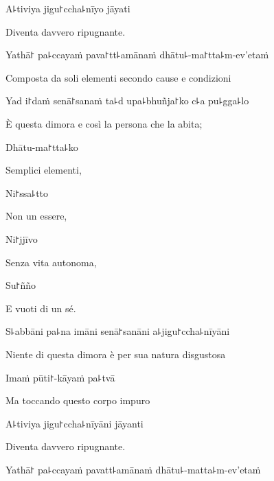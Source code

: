A꜕tiviya jigu꜓ccha꜕nīyo jāyati

\begin{english}
Diventa davvero ripugnante.
\end{english}

Yathā꜓ pa꜕ccayaṁ pava꜓tt꜕amānaṁ dhātu꜕-ma꜓tta꜕m-ev'etaṁ

\begin{english}
Composta da soli elementi secondo cause e condizioni
\end{english}

Yad i꜓daṁ senā꜓sanaṁ ta꜕d upa꜕bhuñja꜓ko c꜕a pu꜕gga꜕lo

\begin{english}
È questa dimora e così la persona che la abita;
\end{english}

Dhātu-ma꜓tta꜕ko

\begin{english}
Semplici elementi,
\end{english}

Ni꜓ssa꜕tto

\begin{english}
Non un essere,
\end{english}

Ni꜓jjīvo

\begin{english}
Senza vita autonoma,
\end{english}

Su꜓ñño

\begin{english}
E vuoti di un sé.
\end{english}

S꜕abbāni pa꜕na imāni senā꜓sanāni a꜕jigu꜓ccha꜕nīyāni

\begin{english}
Niente di questa dimora è per sua natura disgustosa
\end{english}

\clearpage

Imaṁ pūti꜓-kāyaṁ pa꜕tvā

\begin{english}
Ma toccando questo corpo impuro
\end{english}

A꜕tiviya jigu꜓ccha꜕nīyāni jāyanti

\begin{english}
Diventa davvero ripugnante.
\end{english}

Yathā꜓ pa꜕ccayaṁ pavatt꜕amānaṁ dhātu꜕-matta꜕m-ev'etaṁ

